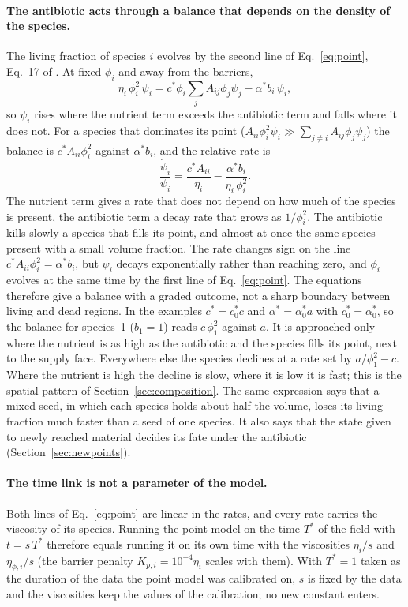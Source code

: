 \documentclass[11pt,a4paper]{article}
\begin{document}
\paragraph{The antibiotic acts through a balance that depends on the density of the species.} The living fraction of species $i$ evolves by the second line of Eq.~\eqref{eq:point}, Eq.~17 of \citet{Klempt2026ContinuumBacterialGrowth}. At fixed $\phi_i$ and away from the barriers,
\begin{equation}
\eta_i\,\phi_i^2\,\dot\psi_i=c^*\phi_i\textstyle\sum_jA_{ij}\phi_j\psi_j-\alpha^*b_i\,\psi_i,
\label{eq:psi}
\end{equation}
so $\psi_i$ rises where the nutrient term exceeds the antibiotic term and falls where it does not. For a species that dominates its point ($A_{ii}\phi_i^2\psi_i\gg\sum_{j\neq i}A_{ij}\phi_j\psi_j$) the balance is $c^*A_{ii}\phi_i^2$ against $\alpha^*b_i$, and the relative rate is
\begin{equation}
\frac{\dot\psi_i}{\psi_i}=\frac{c^*A_{ii}}{\eta_i}-\frac{\alpha^*b_i}{\eta_i\,\phi_i^2}.
\label{eq:rate}
\end{equation}
The nutrient term gives a rate that does not depend on how much of the species is present, the antibiotic term a decay rate that grows as $1/\phi_i^2$. The antibiotic kills slowly a species that fills its point, and almost at once the same species present with a small volume fraction. The rate changes sign on the line $c^*A_{ii}\phi_i^2=\alpha^*b_i$, but $\psi_i$ decays exponentially rather than reaching zero, and $\phi_i$ evolves at the same time by the first line of Eq.~\eqref{eq:point}. The equations therefore give a balance with a graded outcome, not a sharp boundary between living and dead regions. In the examples $c^*=c^*_0c$ and $\alpha^*=\alpha^*_0a$ with $c^*_0=\alpha^*_0$, so the balance for species~1 ($b_1=1$) reads $c\,\phi_1^2$ against $a$. It is approached only where the nutrient is as high as the antibiotic and the species fills its point, next to the supply face. Everywhere else the species declines at a rate set by $a/\phi_1^2-c$. Where the nutrient is high the decline is slow, where it is low it is fast; this is the spatial pattern of Section~\ref{sec:composition}. The same expression says that a mixed seed, in which each species holds about half the volume, loses its living fraction much faster than a seed of one species. It also says that the state given to newly reached material decides its fate under the antibiotic (Section~\ref{sec:newpoints}).

\paragraph{The time link is not a parameter of the model.} Both lines of Eq.~\eqref{eq:point} are linear in the rates, and every rate carries the viscosity of its species. Running the point model on the time $T^*$ of the field with $t=s\,T^*$ therefore equals running it on its own time with the viscosities $\eta_i/s$ and $\eta_{\phi,i}/s$ (the barrier penalty $K_{p,i}=10^{-4}\eta_i$ scales with them). With $T^*=1$ taken as the duration of the data the point model was calibrated on, $s$ is fixed by the data and the viscosities keep the values of the calibration; no new constant enters.
\end{document}
